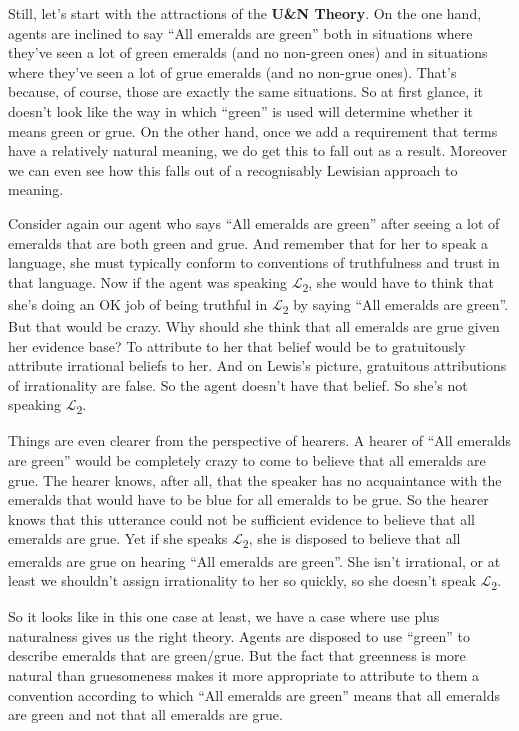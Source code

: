 \documentclass[
  10pt,
  letterpaper,
  DIV=11,
  numbers=noendperiod,
  twoside]{scrartcl}
\begin{document}
Still, let's start with the attractions of the \textbf{U\&N Theory}. On
the one hand, agents are inclined to say ``All emeralds are green'' both
in situations where they've seen a lot of green emeralds (and no
non-green ones) and in situations where they've seen a lot of grue
emeralds (and no non-grue ones). That's because, of course, those are
exactly the same situations. So at first glance, it doesn't look like
the way in which ``green'' is used will determine whether it means green
or grue. On the other hand, once we add a requirement that terms have a
relatively natural meaning, we do get this to fall out as a result.
Moreover we can even see how this falls out of a recognisably Lewisian
approach to meaning.

Consider again our agent who says ``All emeralds are green'' after
seeing a lot of emeralds that are both green and grue. And remember that
for her to speak a language, she must typically conform to conventions
of truthfulness and trust in that language. Now if the agent was
speaking \(\mathcal{L}\)\textsubscript{2}, she would have to think that
she's doing an OK job of being truthful in
\(\mathcal{L}\)\textsubscript{2} by saying ``All emeralds are green''.
But that would be crazy. Why should she think that all emeralds are grue
given her evidence base? To attribute to her that belief would be to
gratuitously attribute irrational beliefs to her. And on Lewis's
picture, gratuitous attributions of irrationality are false. So the
agent doesn't have that belief. So she's not speaking
\(\mathcal{L}\)\textsubscript{2}.

Things are even clearer from the perspective of hearers. A hearer of
``All emeralds are green'' would be completely crazy to come to believe
that all emeralds are grue. The hearer knows, after all, that the
speaker has no acquaintance with the emeralds that would have to be blue
for all emeralds to be grue. So the hearer knows that this utterance
could not be sufficient evidence to believe that all emeralds are grue.
Yet if she speaks \(\mathcal{L}\)\textsubscript{2}, she is disposed to
believe that all emeralds are grue on hearing ``All emeralds are
green''. She isn't irrational, or at least we shouldn't assign
irrationality to her so quickly, so she doesn't speak
\(\mathcal{L}\)\textsubscript{2}.

So it looks like in this one case at least, we have a case where use
plus naturalness gives us the right theory. Agents are disposed to use
``green'' to describe emeralds that are green/grue. But the fact that
greenness is more natural than gruesomeness makes it more appropriate to
attribute to them a convention according to which ``All emeralds are
green'' means that all emeralds are green and not that all emeralds are
grue.
\end{document}
